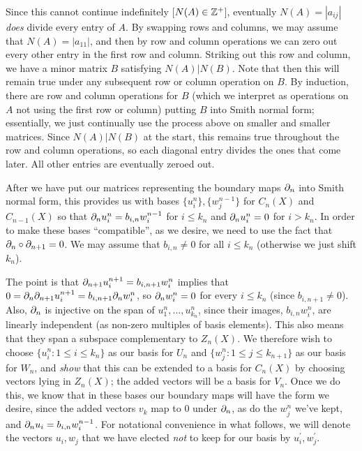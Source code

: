 Since this cannot continue indefinitely [$N(A)\in {\Bbb Z}^+$], 
eventually $N(A)=|a_{ij}|$ {\it does} divide every 
entry of $A$. By swapping rows and columns,
we may assume that $N(A)=|a_{11}|$, and then by row and column 
operations we can zero out every other entry in the first row and column. 
Striking out this row and column, we have a minor matrix $B$ satisfying
$N(A)|N(B)$. Note that then this will remain true under
any subsequent row or column operation on $B$. By induction, there are row and column operations for $B$
(which we interpret as operations on $A$ not using the first row or column)
putting $B$ into Smith normal form; essentially, we just continually
use the process above on smaller and smaller matrices. Since
$N(A)|N(B)$ at the start, this remains true throughout the row and
column operations, so each diagonal entry divides the ones that come
later. All other entries are eventually zeroed out.

\msk

After we have put our matrices representing the boundary maps $\partial_n$ 
into Smith normal form, this provides us with 
bases $\{u_i^n\},\{w_j^{n-1}\}$ for $C_n(X)$ and $C_{n-1}(X)$
so that $\partial_nu_i^n = b_{i,n}w_i^{n-1}$ for $i\leq k_n$ and 
$\partial_nu_i^n=0$ for $i>k_n$. In order to make these bases ``compatible'',
as we desire,
we need to use the fact that $\partial_n\circ \partial_{n+1}=0$.
We may assume that $b_{i,n}\neq 0$ for all $i\leq k_n$ (otherwise we just shift $k_n$).

\ssk

The point is that $\partial_{n+1}u_i^{n+1}=b_{i,n+1}w_i^{n}$ implies that
$0=\partial_n\partial_{n+1}u_i^{n+1}=b_{i,n+1}\partial_nw_i^{n}$, so $\partial_nw_i^{n}=0$
for every $i\leq k_n$ (since $b_{i,n+1}\neq 0$). Also, $\partial_n$ is injective
on the span of $u_1^n,\ldots ,u_{k_n}^n$, since their images, $b_{i,n}w_i^n$,
are linearly independent (as non-zero multiples of basis elements). This also means 
that they span a subspace complementary to $Z_n(X)$. We therefore wish to choose 
$\{u_i^n : 1\leq i\leq k_n\}$ as our basis for $U_n$
and $\{w_j^n : 1\leq j \leq k_{n+1}\}$ as our basis for $W_n$, and {\it show}
that this can be extended to a basis for $C_n(X)$ by choosing vectors lying in 
$Z_n(X)$; the added vectors will be a basis for $V_n$. Once we do this, we know that
in these bases our boundary maps will have the form we desire, since the added
vectors $v_k$ map to $0$ under $\partial_n$, as do the $w_j^n$ we've kept,  and
$\partial_nu_i=b_{i,n}w_i^{n-1}$. For notational convenience in what follows, we will denote
the vectors $u_i,w_j$ that we have elected {\it not} to keep for our basis
by $u_i^\prime,w_j^\prime$.


